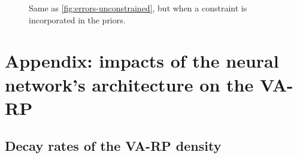 \begin{figure}[h]
    \centering
    \caption{Same as \cref{fig:errors-unconstrained}, but when a constraint is incorporated in the priors.}
    \label{fig:errors-constrained}
\end{figure}









\section{Appendix: impacts of the neural network's architecture on the VA-RP}\label{sec:constr-frags:app}




\subsection{Decay rates of the VA-RP density}\label{app:decay-rates}

